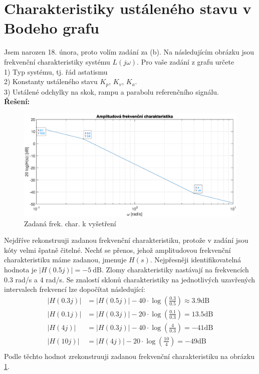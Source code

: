 \documentclass[twoside]{article}
\begin{document}
\section{Charakteristiky ustáleného stavu v Bodeho grafu}
Jsem narozen 18. února, proto volím zadání za (b).
Na následujícím obrázku jsou frekvenční charakteristiky systému $L(j\omega)$. 
Pro vaše zadání z grafu určete \\
1) Typ systému, tj. řád astatismu \\
2) Konstanty ustáleného stavu $K_p$, $K_v$, $K_a$. \\
3) Ustálené odchylky na skok, rampu a parabolu referenčního signálu. \\
\textbf{Řešení:}

\begin{figure}[htbp]
	\centering
	\includegraphics[width=\linewidth]{frek_zadani.eps}
	\caption{Zadaná frek. char. k vyšetření}
	\label{fig:frek_zadani}
\end{figure}

Nejdříve rekonstruuji zadanou frekvenční charakteristiku, protože v zadání jsou kóty velmi špatně čitelné. Nechť se přenos, jehož
amplitudovou frekvenční charakteristiku máme zadanou, jmenuje $H(s)$. Nejpřesněji identifikovatelná hodnota je $|H(0.5j)| = -5~\text{dB}$.
Zlomy charakteristiky nastávají na frekvencích 0.3 rad/s a 4 rad/s.
Se znalostí sklonů charakteristiky na jednotlivých uzavřených intervalech frekvencí lze dopočítat následující:
\begin{equation}
	\begin{split}
		|H(0.3j)| &= |H(0.5j)| - 40 \cdot \log(\frac{0.3}{0.5}) \approx 3.9 \text{dB} \\
		|H(0.1j)| &= |H(0.3j)| - 20 \cdot \log(\frac{0.1}{0.3}) = 13.5 \text{dB} \\
		|H(4j)| &= |H(0.3j)| - 40 \cdot \log(\frac{4}{0.3}) = -41 \text{dB} \\
		|H(10j)| &= |H(4j)| - 20 \cdot \log(\frac{10}{4}) = -49 \text{dB} \\
	\end{split}
\end{equation}
Podle těchto hodnot zrekonstruuji zadanou frekvenční charakteristiku na obrázku \ref{fig:frek_zadani}.
\end{document}
